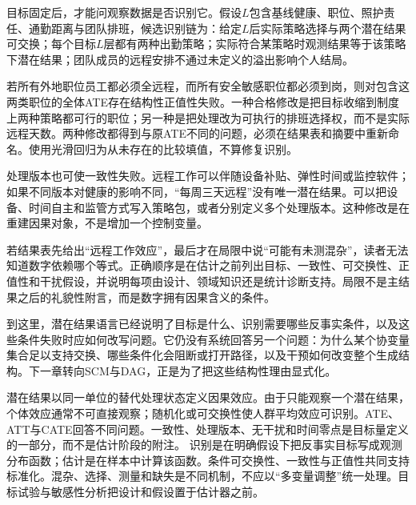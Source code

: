 目标固定后，才能问观察数据是否识别它。假设$L$包含基线健康、职位、照护责任、通勤距离与团队排班，候选识别链为：给定$L$后实际策略选择与两个潜在结果可交换；每个目标$L$层都有两种出勤策略；实际符合某策略时观测结果等于该策略下潜在结果；团队成员的远程安排不通过未定义的溢出影响个人结局。

\begin{workedexample}[识别失败时如何改目标]
若所有外地职位员工都必须全远程，而所有安全敏感职位都必须到岗，则对包含这两类职位的全体ATE存在结构性正值性失败。一种合格修改是把目标收缩到制度上两种策略都可行的职位；另一种是把处理改为可执行的排班选择权，而不是实际远程天数。两种修改都得到与原ATE不同的问题，必须在结果表和摘要中重新命名。使用光滑回归为从未存在的比较填值，不算修复识别。
\end{workedexample}

处理版本也可使一致性失败。远程工作可以伴随设备补贴、弹性时间或监控软件；如果不同版本对健康的影响不同，“每周三天远程”没有唯一潜在结果。可以把设备、时间自主和监管方式写入策略包，或者分别定义多个处理版本。这种修改是在重建因果对象，不是增加一个控制变量。

\begin{failurecheck}[识别假设只出现在讨论部分]
若结果表先给出“远程工作效应”，最后才在局限中说“可能有未测混杂”，读者无法知道数字依赖哪个等式。正确顺序是在估计之前列出目标、一致性、可交换性、正值性和干扰假设，并说明每项由设计、领域知识还是统计诊断支持。局限不是主结果之后的礼貌性附言，而是数字拥有因果含义的条件。
\end{failurecheck}

到这里，潜在结果语言已经说明了目标是什么、识别需要哪些反事实条件，以及这些条件失败时应如何改写问题。它仍没有系统回答另一个问题：为什么某个协变量集合足以支持交换、哪些条件化会阻断或打开路径，以及干预如何改变整个生成结构。下一章转向SCM与DAG，正是为了把这些结构性理由显式化。

\begin{chapterreview}
潜在结果以同一单位的替代处理状态定义因果效应。由于只能观察一个潜在结果，个体效应通常不可直接观察；随机化或可交换性使人群平均效应可识别。ATE、ATT与CATE回答不同问题。一致性、处理版本、无干扰和时间零点是目标量定义的一部分，而不是估计阶段的附注。 识别是在明确假设下把反事实目标写成观测分布函数；估计是在样本中计算该函数。条件可交换性、一致性与正值性共同支持标准化。混杂、选择、测量和缺失是不同机制，不应以“多变量调整”统一处理。目标试验与敏感性分析把设计和假设置于估计器之前。
\end{chapterreview}

